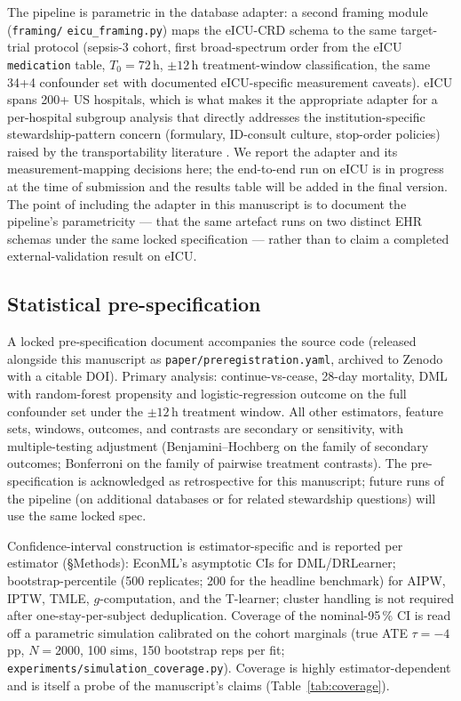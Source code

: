 \documentclass[11pt,a4paper]{article}
\begin{document}
The pipeline is parametric in the database adapter: a second framing module (\texttt{framing/} \texttt{eicu\_framing.py}) maps the eICU-CRD schema \cite{pollard2018eicu} to the same target-trial protocol (sepsis-3 cohort, first broad-spectrum order from the eICU \texttt{medication} table, $T_0 = 72$\,h, $\pm 12$\,h treatment-window classification, the same 34+4 confounder set with documented eICU-specific measurement caveats). eICU spans 200+ US hospitals, which is what makes it the appropriate adapter for a per-hospital subgroup analysis that directly addresses the institution-specific stewardship-pattern concern (formulary, ID-consult culture, stop-order policies) raised by the transportability literature \cite{wornow2025transportability}. We report the adapter and its measurement-mapping decisions here; the end-to-end run on eICU is in progress at the time of submission and the results table will be added in the final version. The point of including the adapter in this manuscript is to document the pipeline's parametricity --- that the same artefact runs on two distinct EHR schemas under the same locked specification --- rather than to claim a completed external-validation result on eICU.

\subsection{Statistical pre-specification}
\label{sec:prespec}

A locked pre-specification document accompanies the source code (released alongside this manuscript as \texttt{paper/preregistration.yaml}, archived to Zenodo with a citable DOI). Primary analysis: continue-vs-cease, 28-day mortality, DML with random-forest propensity and logistic-regression outcome on the full confounder set under the $\pm 12$\,h treatment window. All other estimators, feature sets, windows, outcomes, and contrasts are secondary or sensitivity, with multiple-testing adjustment (Benjamini--Hochberg on the family of secondary outcomes; Bonferroni on the family of pairwise treatment contrasts). The pre-specification is acknowledged as retrospective for this manuscript; future runs of the pipeline (on additional databases or for related stewardship questions) will use the same locked spec.

Confidence-interval construction is estimator-specific and is reported per estimator (\S Methods): EconML's asymptotic CIs for DML/DRLearner; bootstrap-percentile (500 replicates; 200 for the headline benchmark) for AIPW, IPTW, TMLE, $g$-computation, and the T-learner; cluster handling is not required after one-stay-per-subject deduplication. Coverage of the nominal-95\,\% CI is read off a parametric simulation calibrated on the cohort marginals (true ATE $\tau = -4$\,pp, $N=2000$, 100 sims, 150 bootstrap reps per fit; \texttt{experiments/simulation\_coverage.py}). Coverage is highly estimator-dependent and is itself a probe of the manuscript's claims (Table~\ref{tab:coverage}).
\end{document}
